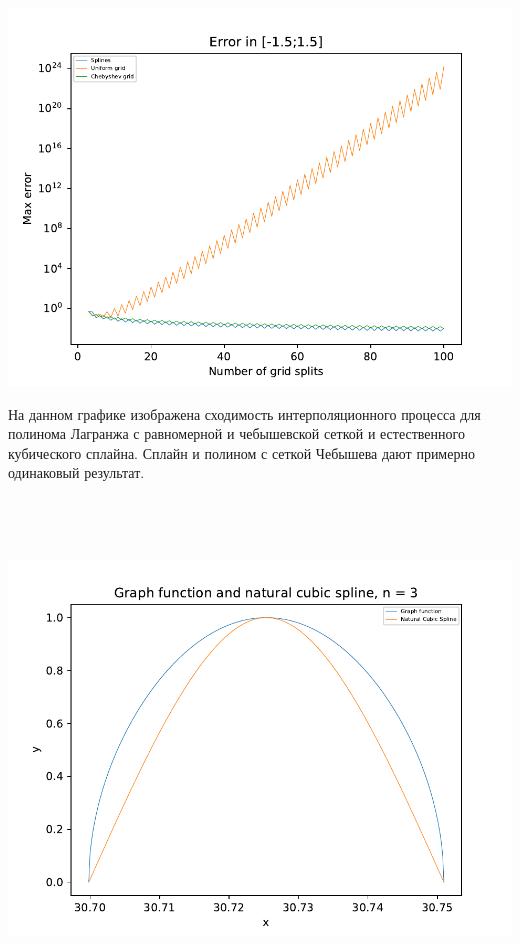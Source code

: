 \includegraphics[scale=0.75]{10.pdf}

На данном графике изображена сходимость интерполяционного процесса для полинома Лагранжа с равномерной и чебышевской сеткой и естественного кубического сплайна. Сплайн и полином с сеткой Чебышева дают примерно одинаковый результат.

\subsection{ \begin{math} 
		[\sqrt{300*\pi}; \sqrt{301*\pi}]
\end{math}}

\includegraphics[scale=0.75]{3.pdf}


